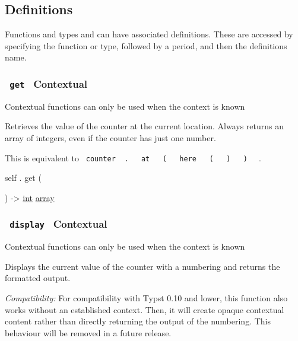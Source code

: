 \subsection{\texorpdfstring{{ Definitions
}}{ Definitions }}\label{definitions}

\label{definitions-tooltip}
Functions and types and can have associated definitions. These are
accessed by specifying the function or type, followed by a period, and
then the definition\textquotesingle s name.

\subsubsection{\texorpdfstring{\texttt{\ get\ } {{ Contextual
}}}{ get   Contextual }}\label{definitions-get}

\label{definitions-get-contextual-tooltip}
Contextual functions can only be used when the context is known

Retrieves the value of the counter at the current location. Always
returns an array of integers, even if the counter has just one number.

This is equivalent to
\texttt{\ counter\ }{\texttt{\ .\ }}\texttt{\ }{\texttt{\ at\ }}\texttt{\ }{\texttt{\ (\ }}\texttt{\ }{\texttt{\ here\ }}\texttt{\ }{\texttt{\ (\ }}\texttt{\ }{\texttt{\ )\ }}\texttt{\ }{\texttt{\ )\ }}\texttt{\ }
.

self { . } { get } (

) -\textgreater{} \href{/docs/reference/foundations/int/}{int}
\href{/docs/reference/foundations/array/}{array}

\subsubsection{\texorpdfstring{\texttt{\ display\ } {{ Contextual
}}}{ display   Contextual }}\label{definitions-display}

\label{definitions-display-contextual-tooltip}
Contextual functions can only be used when the context is known

Displays the current value of the counter with a numbering and returns
the formatted output.

\emph{Compatibility:} For compatibility with Typst 0.10 and lower, this
function also works without an established context. Then, it will create
opaque contextual content rather than directly returning the output of
the numbering. This behaviour will be removed in a future release.

